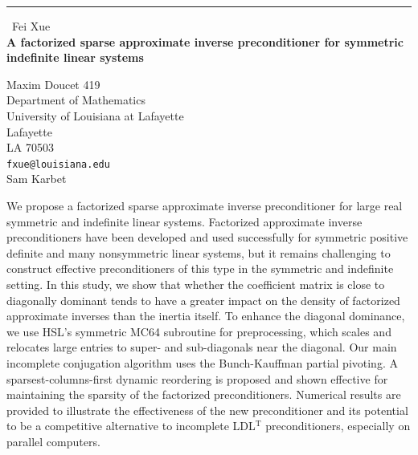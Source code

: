 \documentclass{report}
\begin{document}
\begin{center}
\rule{6in}{1pt} \
{\large Fei Xue \\
{\bf A factorized sparse approximate inverse preconditioner for symmetric indefinite linear systems}}

Maxim Doucet 419 \\ Department of Mathematics \\ University of Louisiana at Lafayette \\ Lafayette \\ LA 70503
\\
{\tt fxue@louisiana.edu}\\
Sam Karbet\end{center}

We propose a factorized sparse approximate inverse preconditioner for
large real symmetric and indefinite linear systems. Factorized
approximate inverse preconditioners have been developed and used
successfully for symmetric positive definite and many nonsymmetric linear
systems, but it remains challenging to construct effective
preconditioners of this type in the symmetric and indefinite setting. In
this study, we show that whether the coefficient matrix is close to
diagonally dominant tends to have a greater impact on the density of
factorized approximate inverses than the inertia itself. To enhance the
diagonal dominance, we use HSL's symmetric MC64 subroutine for
preprocessing, which scales and relocates large entries to super- and
sub-diagonals near the diagonal. Our main incomplete conjugation
algorithm uses the Bunch-Kauffman partial pivoting. A
sparsest-columns-first dynamic reordering is proposed and shown effective
for maintaining the sparsity of the factorized preconditioners. Numerical
results are provided to illustrate the effectiveness of the new
preconditioner and its potential to be a competitive alternative to
incomplete LDL$^\mathrm{T}$ preconditioners, especially on parallel
computers.
\end{document}
